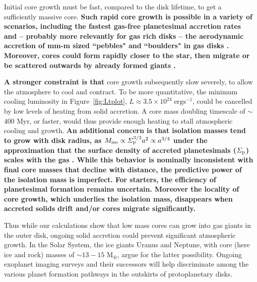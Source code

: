 \documentclass[apj, numberedappendix]{emulateapj}
\newcommand{\Fig}[1]{Figure~\ref{#1}}
\begin{document}
Initial core growth must be fast, compared to the disk lifetime, to get a sufficiently massive core.  \textbf{Such rapid core growth is possible in a variety of scenarios, including the fastest gas-free planetesimal accretion rates \citep{dones93} and -- probably more relevantly for gas rich disks --  the aerodynamic accretion of mm-m sized ``pebbles" and ``boulders" in gas disks \citep{ormel10, lambrechts12}.  Moreover, cores could form rapidly closer to the star, then migrate or be scattered outwards by already formed giants \citep{ida13}.} 
 
\textbf{A stronger constraint is that} core growth subsequently slow severely, to allow the atmosphere to cool and contract.  To be more quantitative, the minimum cooling luminosity in \Fig{fig:Ltplot}, $L\approx 3.5 \times 10^{24}\;\mathrm{erg s}^{-1}$, could be cancelled by low levels of heating from solid accretion.   A core mass doubling timescale of $\sim$$400$ Myr, or faster, would thus provide enough heating to stall atmospheric cooling and growth.   \textbf{An additional concern is that isolation masses tend to grow with disk radius, as $M_{\rm iso} \propto \varSigma_{\rm p}^{3/2} a^2 \propto a^{3/4}$ under the approximation that the surface density of accreted planetesimals ($\varSigma_{\rm p}$) scales with the gas \citep{youdin13}.   While this behavior is nominally inconsistent with final core masses that decline with distance, the predictive power of the isolation mass is imperfect.   For starters, the efficiency of planetesimal formation remains uncertain.  Moreover the locality of core growth, which underlies the isolation mass, disappears when accreted solids drift and/or cores migrate significantly. } 
  
Thus while our calculations show that low mass cores can grow into gas giants in the outer disk, ongoing solid accretion could prevent significant atmospheric growth.  In the Solar System, the ice giants Uranus and Neptune,  with core (here ice and rock) masses of $\sim 13 -15$ M$_\oplus$, argue for the latter possibility.  Ongoing exoplanet imaging surveys and their successors \citep{hinz12, macintosh12, close14} will help discriminate among the various planet formation pathways in the outskirts of protoplanetary disks.

\vspace*{5 mm}

\end{document}
